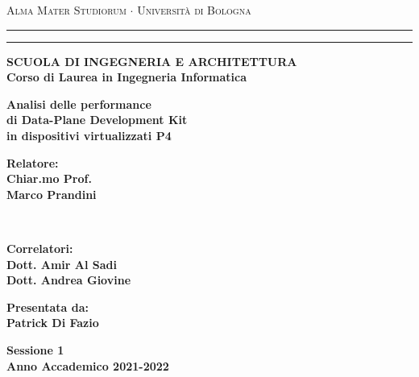 \documentclass{report}
\newcommand\myemptypage{
    \null
    \thispagestyle{empty}
    \newpage
}
\begin{document}
\begin{titlepage}
\begin{center}
{{\Large{\textsc{Alma Mater Studiorum $\cdot$ Universit\`a di
Bologna}}}} \rule[0.1cm]{15.8cm}{0.1mm}
\rule[0.5cm]{15.8cm}{0.6mm}
{\small{\bf SCUOLA DI INGEGNERIA E ARCHITETTURA\\
Corso di Laurea in Ingegneria Informatica }}
\end{center}
\vspace{15mm}
\begin{center}
{\LARGE{\bf Analisi delle performance}}\\
\vspace{3mm}
{\LARGE{\bf di Data-Plane Development Kit}}\\
\vspace{3mm}
{\LARGE{\bf in dispositivi virtualizzati P4 }}\\
\end{center}
\vspace{40mm}
\par
\noindent
\begin{minipage}[t]{0.47\textwidth}
{\large{\bf Relatore:\\
Chiar.mo Prof.\\
Marco Prandini}}
\vspace{1cm}
\end{minipage}
\\
\begin{minipage}[t]{0.47\textwidth}
{\large{\bf Correlatori:\\
Dott. Amir Al Sadi\\
Dott. Andrea Giovine}}

\end{minipage}
\hfill
\begin{minipage}[t]{0.47\textwidth}\raggedleft
{\large{\bf Presentata da:\\
Patrick Di Fazio}}
\end{minipage}
\vspace{20mm}
\begin{center}
{\large{\bf Sessione 1\\
Anno Accademico 2021-2022}}
\end{center}
\end{titlepage}



\myemptypage

\tableofcontents
\newpage


\newpage
\myemptypage

\newpage

\newpage

\newpage

\newpage

\newpage
\end{document}

